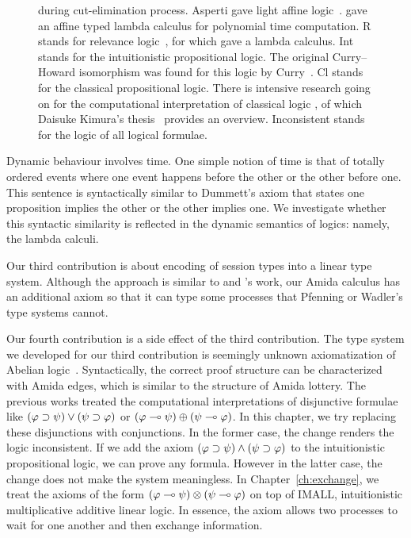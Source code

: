 \begin{figure}
{{  during cut-elimination process.
  Asperti gave light affine logic~\citep{asperti2002}.
  \citet{terui2007} gave an affine typed lambda calculus for polynomial
  time computation.
  \textsf{R} stands for relevance logic~\citep{urquhart1972},
  for which \citet{gabbay1992} gave a lambda calculus.
  \textsf{Int} stands for the intuitionistic propositional logic.
  The original Curry--Howard isomorphism was found for this logic by
  Curry~\citep{curry1942}.
  \textsf{Cl} stands for the classical propositional logic.
  There is intensive research going on for the computational
  interpretation of classical logic
  \citep{lambdamu,filinski1989,griffin1990,ong-stewart,selinger2001,kakutani2002,curien2000,wadler-dual,
  wadler-reloaded}, of which
  Daisuke Kimura's thesis~\cite{kimura} provides an overview.
  \textsf{Inconsistent} stands for the logic of all logical formulae.}
  }
  \label{fig:lattice}
 \end{figure}
Dynamic behaviour involves time.
One simple notion of time is that of totally ordered events where
one event happens before the other or the other before one.
This sentence is syntactically similar to Dummett's axiom that states
one proposition implies the other or the other implies one.
We investigate whether this syntactic similarity is reflected
in the dynamic semantics of logics: namely, the lambda calculi.

Our third contribution is about encoding of session types into a linear
type system.  Although the approach is similar to \citet{pfenning2010} and
\citet{wadler2012propositions}'s work, our Amida calculus has an
additional axiom so that it can type some processes that Pfenning or
Wadler's type systems cannot.

Our fourth contribution is a side effect of the third contribution.
The type system we developed for our third contribution is seemingly
unknown axiomatization of Abelian logic~\citep{casari1989}.
Syntactically, the correct proof structure can be characterized with
Amida edges, which is similar to the structure of Amida lottery.
The previous works treated the computational interpretations of
disjunctive formulae like $(\varphi\supset\psi)\lor(\psi\supset\varphi)$ or
$(\varphi\multimap\psi)\oplus(\psi\multimap\varphi)$.  In this chapter, we try
replacing these disjunctions with conjunctions.
In the former case, the change renders the logic inconsistent.
If we add the axiom $(\varphi\supset\psi)\land(\psi\supset\varphi)$ to the
intuitionistic propositional logic,
we can prove any formula.  However in the latter case, the change does
not make the system meaningless.
In Chapter~\ref{ch:exchange}, we treat
the axioms of the form $(\varphi\multimap\psi)\otimes(\psi\multimap\varphi)$
on top of IMALL, intuitionistic
multiplicative additive linear
logic.  In essence, the axiom allows two processes to wait for one
another and then exchange information.

